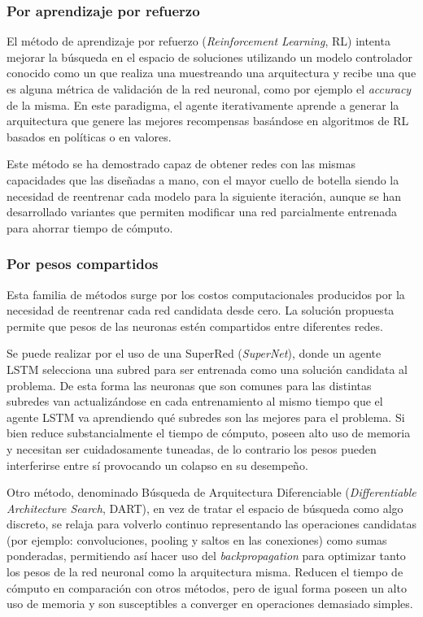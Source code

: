 \subsubsection{Por aprendizaje por refuerzo}
El método de aprendizaje por refuerzo (\textit{Reinforcement Learning}, RL) intenta mejorar la búsqueda en el espacio de soluciones utilizando un modelo controlador conocido como un  que realiza una  muestreando una arquitectura y recibe una  que es alguna métrica de validación de la red neuronal, como por ejemplo el \textit{accuracy} de la misma. En este paradigma, el agente iterativamente aprende a generar la arquitectura que genere las mejores recompensas basándose en algoritmos de RL basados en políticas o en valores.

Este método se ha demostrado capaz de obtener redes con las mismas capacidades que las diseñadas a mano, con el mayor cuello de botella siendo la necesidad de reentrenar cada modelo para la siguiente iteración, aunque se han desarrollado variantes que permiten modificar una red parcialmente entrenada para ahorrar tiempo de cómputo.

\subsubsection{Por pesos compartidos}
Esta familia de métodos surge por los costos computacionales producidos por la necesidad de reentrenar cada red candidata desde cero. La solución propuesta permite que pesos de las neuronas estén compartidos entre diferentes redes.

Se puede realizar por el uso de una SuperRed (\textit{SuperNet}), donde un agente LSTM selecciona una subred para ser entrenada como una solución candidata al problema. De  esta forma las neuronas que son comunes para las distintas subredes van actualizándose en cada entrenamiento al mismo tiempo que el agente LSTM va aprendiendo qué subredes son las mejores para el problema. Si bien reduce substancialmente el tiempo de cómputo, poseen alto uso de memoria y necesitan ser cuidadosamente tuneadas, de lo contrario los pesos pueden interferirse entre sí provocando un colapso en su desempeño.

Otro método, denominado Búsqueda de Arquitectura Diferenciable (\textit{Differentiable Architecture Search}, DART), en vez de tratar el espacio de búsqueda como algo discreto, se relaja para volverlo continuo representando las operaciones candidatas (por ejemplo: convoluciones, pooling y saltos en las conexiones) como sumas ponderadas, permitiendo así hacer uso del \textit{backpropagation} para optimizar tanto los pesos de la red neuronal como la arquitectura misma. Reducen el tiempo de cómputo en comparación con otros métodos, pero de igual forma poseen un alto uso de memoria y son susceptibles a converger en operaciones demasiado simples.

